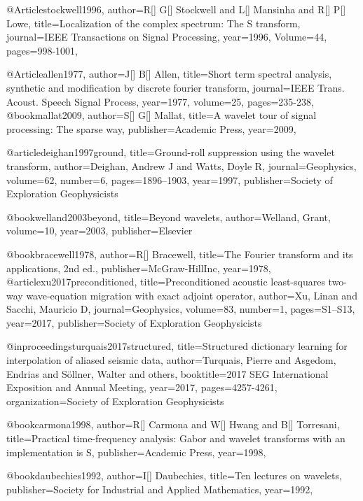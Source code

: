 @Article{stockwell1996,
  author={R[] G[] Stockwell and L[] Mansinha and R[] P[] Lowe},
  title={Localization of the complex spectrum: The S transform},
  journal={IEEE Transactions on Signal Processing},
  year=1996,
  Volume=44,
  pages={998-1001},
}

@Article{allen1977,
  author={J[] B[] Allen},
  title={Short term spectral analysis, synthetic and modification by discrete fourier transform},
  journal={IEEE Trans. Acoust. Speech Signal Process},
  year=1977,
  volume=25,
  pages={235-238},
}
@book{mallat2009,
  author={S[] G[] Mallat},
  title={A wavelet tour of signal processing: The sparse way},
  publisher={Academic Press},
  year=2009,
}

@article{deighan1997ground,
  title={Ground-roll suppression using the wavelet transform},
  author={Deighan, Andrew J and Watts, Doyle R},
  journal={Geophysics},
  volume={62},
  number={6},
  pages={1896--1903},
  year={1997},
  publisher={Society of Exploration Geophysicists}
}

@book{welland2003beyond,
  title={Beyond wavelets},
  author={Welland, Grant},
  volume={10},
  year={2003},
  publisher={Elsevier}
}


@book{bracewell1978,
  author={R[] Bracewell},
  title={The {F}ourier transform and its applications, 2nd ed.},
  publisher={McGraw-HillInc},
  year=1978,
}
@article{xu2017preconditioned,
  title={Preconditioned acoustic least-squares two-way wave-equation migration with exact adjoint operator},
  author={Xu, Linan and Sacchi, Mauricio D},
  journal={Geophysics},
  volume={83},
  number={1},
  pages={S1--S13},
  year={2017},
  publisher={Society of Exploration Geophysicists}
}


@inproceedings{turquais2017structured,
  title={Structured dictionary learning for interpolation of aliased seismic data},
  author={Turquais, Pierre and Asgedom, Endrias and S{\"o}llner, Walter and others},
  booktitle={2017 SEG International Exposition and Annual Meeting},
  year={2017},
  pages={4257-4261},
  organization={Society of Exploration Geophysicists}
}

@book{carmona1998,
  author={R[] Carmona and W[] Hwang and B[] Torresani},
  title={Practical time-frequency analysis: Gabor and wavelet transforms with an implementation is S},
  publisher={Academic Press},
  year=1998,
}

@book{daubechies1992,
  author={I[] Daubechies},
  title={Ten lectures on wavelets},
  publisher={Society for Industrial and Applied Mathematics},
  year=1992,
}

